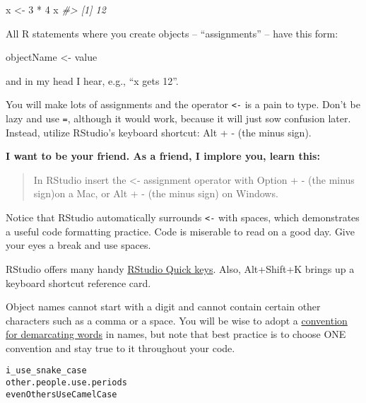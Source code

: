 \documentclass[
]{book}
\newenvironment{Shaded}{\begin{snugshade}}{\end{snugshade}}
\newcommand{\CommentTok}[1]{\textcolor[rgb]{0.56,0.35,0.01}{\textit{#1}}}
\newcommand{\DecValTok}[1]{\textcolor[rgb]{0.00,0.00,0.81}{#1}}
\newcommand{\NormalTok}[1]{#1}
\newcommand{\OtherTok}[1]{\textcolor[rgb]{0.56,0.35,0.01}{#1}}
\newcommand{\SpecialCharTok}[1]{\textcolor[rgb]{0.00,0.00,0.00}{#1}}
\begin{document}
\begin{Shaded}
\begin{Highlighting}[]
\NormalTok{x }\OtherTok{\textless{}{-}} \DecValTok{3} \SpecialCharTok{*} \DecValTok{4}
\NormalTok{x}
\CommentTok{\#\textgreater{} [1] 12}
\end{Highlighting}
\end{Shaded}

All R statements where you create objects -- ``assignments'' -- have this form:

\begin{Shaded}
\begin{Highlighting}[]
\NormalTok{objectName }\OtherTok{\textless{}{-}}\NormalTok{ value}
\end{Highlighting}
\end{Shaded}

and in my head I hear, e.g., ``x gets 12''.

You will make lots of assignments and the operator \texttt{\textless{}-} is a pain to type. Don't be lazy and use \texttt{=}, although it would work, because it will just sow confusion later. Instead, utilize RStudio's keyboard shortcut: Alt + - (the minus sign).

\textbf{I want to be your friend. As a friend, I implore you, learn this:}

\begin{quote}
In RStudio insert the \textless- assignment operator with Option + - (the minus sign)on a Mac, or Alt + - (the minus sign) on Windows.
\end{quote}

Notice that RStudio automatically surrounds \texttt{\textless{}-} with spaces, which demonstrates a useful code formatting practice. Code is miserable to read on a good day. Give your eyes a break and use spaces.

RStudio offers many handy \href{https://support.rstudio.com/hc/en-us/articles/200711853-Keyboard-Shortcuts-in-the-RStudio-IDE}{RStudio Quick keys}. Also, Alt+Shift+K brings up a keyboard shortcut reference card.

Object names cannot start with a digit and cannot contain certain other characters such as a comma or a space. You will be wise to adopt a \href{https://en.wikipedia.org/wiki/Snake_case}{convention for demarcating words} in names, but note that best practice is to choose ONE convention and stay true to it throughout your code.

\begin{verbatim}
i_use_snake_case
other.people.use.periods
evenOthersUseCamelCase
\end{verbatim}
\end{document}
